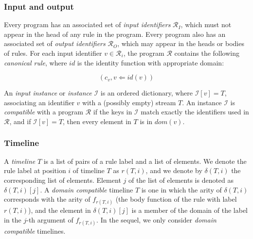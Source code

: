 \subsubsection{Input and output}

Every program has an associated set of {\em input identifiers} $\mathcal{R}_I$, which must not appear in the head of any rule in the program.  Every program also has an associated set of {\em output identifiers} $\mathcal{R}_O$, which may appear in the heads or bodies of rules.  For each input identifier $v \in \mathcal{R}_i$, the program $\mathcal{R}$ contains the following {\em canonical rule}, where $id$ is the identity function with appropriate domain:

$$(c_v, v \Leftarrow id(v)) $$

An {\em input instance} or {\em instance} $\mathcal{I}$ is an ordered dictionary, where $\mathcal{I}[v] = T$, associating an identifier $v$ with a (possibly empty) stream $T$.  An instance $\mathcal{I}$ is {\em compatible} with a program $\mathcal{R}$ if the keys in $\mathcal{I}$ match exactly the identifiers used in $\mathcal{R}$, and if $\mathcal{I}[v] = T$, then every element in $T$ is in $dom(v)$.

\subsubsection{Timeline}

A {\em timeline} $T$ is a list of pairs of a rule label and a list of elements.  We denote the rule label at position $i$ of timeline $T$ as $r(T, i)$, and we denote by $\delta(T, i)$ the corresponding list of elements.  Element $j$ of the list of elements is denoted as $\delta(T,i)[j]$.  A {\em domain compatible} timeline $T$ is one in which the arity of $\delta(T, i)$ corresponds with the arity of $f_{r(T,i)}$ (the body function of the rule with label $r(T,i)$), and the element in $\delta(T,i)[j]$ is a member of the domain of the label in the $j$-th argument of $f_{r(T,i)}$.  In the sequel, we only consider {\em domain compatible} timelines.

